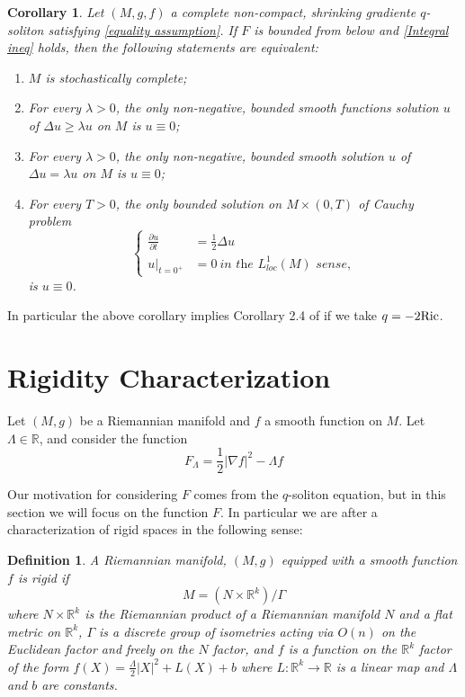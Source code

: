\documentclass{amsart}
\theoremstyle{plain}
\newtheorem{corollary}[theorem]{\bf Corollary}
\newtheorem{definition}[theorem]{\bf Definition}
\numberwithin{equation}{section}
\begin{document}
\begin{corollary}
    Let $(M,g, f)$ a complete non-compact, shrinking gradiente $q$-soliton satisfying \eqref{equality assumption}. If $F$ is bounded from below and \eqref{Integral ineq} holds, then the following statements are equivalent:
    \begin{enumerate}
       

        \item [i)] $M$ is stochastically complete;

        \item [ii)] For every $\lambda >0$, the only non-negative, bounded smooth functions solution $u$ of $\Delta u \geq \lambda u$ on $M$ is $u\equiv0$;
        
        \item [iii)] For every $\lambda>0$, the only non-negative, bounded smooth solution $u$ of $\Delta u=\lambda u$ on $M$ is $u\equiv0$;

        \item [iv)] For every $T>0$, the only bounded solution on $M\times (0,T)$ of Cauchy problem \begin{equation*}
        \left\lbrace \begin{matrix}
            \frac{\partial u}{\partial t} & =\frac{1}{2}\Delta u \\
            u|_{t=0^+} & =0 \ \textit{in the $L^{1}_{loc}(M)$ sense},
        \end{matrix} \right.
        \end{equation*} 
is $u\equiv 0$.
    \end{enumerate}
\end{corollary}
In particular the above corollary implies Corollary 2.4 of \cite{GR} if we take $q=-2{\rm Ric}$.


\noindent
\section{Rigidity Characterization}


Let $(M,g)$ be a Riemannian manifold and $f$ a smooth function on $M$.  Let $\Lambda \in \mathbb{R}$, and  consider the function 
\[ F_{\Lambda} = \frac{1}{2}|\nabla f|^2 -  \Lambda f \]

Our motivation for considering $F$ comes from the $q$-soliton equation, but in this section we will focus on the function $F$.   In particular we are after a characterization of rigid spaces in the following sense: 

\begin{definition} \label{rigid-defn}
A Riemannian manifold, $(M,g)$ equipped with a smooth function $f$ is rigid if 
\[ M = (N \times \mathbb{R}^k)/{\Gamma}\]
where $N \times \mathbb{R}^k$ is the Riemannian product of a Riemannian manifold $N$ and a flat metric on $\mathbb{R}^k$, $\Gamma$ is a discrete group of isometries acting via $O(n)$ on the Euclidean factor and freely on the $N$ factor, and $f$ is a function on the $\mathbb{R}^k$ factor of the form $f(X) = \frac{\Lambda}{2}|X|^2 +L(X) + b$ where $L:\mathbb{R}^k \to \mathbb{R}$ is a linear map and $\Lambda$ and $b$ are constants.  
\end{definition}
\end{document}
